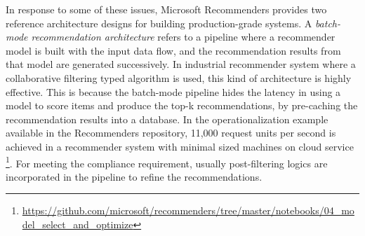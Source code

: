 %
In response to some of these issues, 
Microsoft Recommenders provides two reference architecture designs for building production-grade systems. 
A \textit{batch-mode recommendation architecture} refers to a pipeline where a recommender model is built with the input data flow, and the recommendation results from that model are generated successively. In industrial recommender system where a collaborative filtering typed algorithm is used, this kind of architecture is highly effective. This is because the batch-mode pipeline hides the latency in using a model to score items and produce the top-k recommendations, by pre-caching the recommendation results into a database. In the operationalization example available in the Recommenders repository, 11,000 request units per second is achieved in a recommender system with minimal sized machines on cloud service \footnote{\url{https://github.com/microsoft/recommenders/tree/master/notebooks/04_model_select_and_optimize}}\label{model_select}. 
For meeting the compliance requirement, usually post-filtering logics are incorporated in the pipeline to refine the recommendations.

